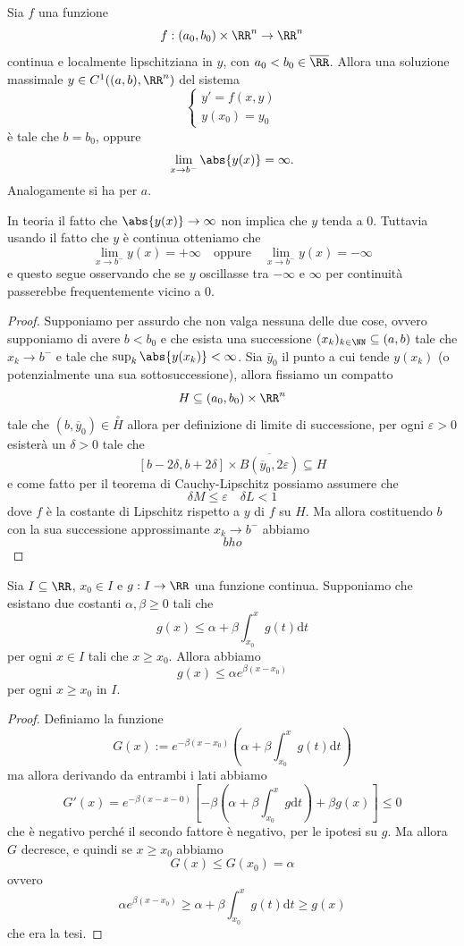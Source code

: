 \documentclass[11pt]{scrartcl}
\newcommand{\dif}{\text{d}}
\begin{document}
 	\begin{theorem}
 		Sia $f$ una funzione 
 		$$f:(a_0,b_0)\times \RR^n\to\RR^n$$
 		continua e localmente lipschitziana in $y$, con $a_0<b_0\in\overline{\RR}$. Allora una soluzione massimale $y\in  C^1((a,b),\RR^n)$ del sistema
 		$$
 		\begin{cases}
 			y'=f(x,y) \\
 			y(x_0)=y_0
 		\end{cases}
 		$$
 		è tale che $b=b_0$, oppure
 		$$\lim_{x\to b^-}\abs{y(x)}=\infty.$$
 		Analogamente si ha per $a$.
 	\end{theorem}
 	\begin{remark}
 		In teoria il fatto che $\abs{y(x)}\to \infty$ non implica che $y$ tenda a $0$. Tuttavia usando il fatto che $y$ è continua otteniamo che
 		$$\lim_{x\to b^-}y(x)=+\infty \quad \text{oppure} \quad \lim_{x\to b^-}y(x)=-\infty$$
 		e questo segue osservando che se $y$ oscillasse tra $-\infty$ e $\infty$ per continuità passerebbe frequentemente vicino a $0$.
 	\end{remark}
 	\begin{proof}
 		Supponiamo per assurdo che non valga nessuna delle due cose, ovvero supponiamo di avere $b<b_0$ e che esista una successione $(x_k)_{k\in\NN}\subseteq (a,b)$ tale che $x_k\to b^-$ e tale che $\sup_k\abs{y(x_k)}<\infty$. Sia $\bar{y}_0$ il punto a cui tende $y(x_k)$ (o potenzialmente una sua sottosuccessione), allora fissiamo un compatto 
 		$$H\subseteq (a_0,b_0)\times\RR^n$$
 		tale che $(b,\overline{y}_0)\in \overset{\circ}{H}$ allora per definizione di limite di successione, per ogni $\varepsilon>0$ esisterà un $\delta>0$ tale che
 		$$[b-2\delta,b+2\delta]\times \overline{B(\overline{y}_0,2\varepsilon)}\subseteq H$$
 		e come fatto per il teorema di Cauchy-Lipschitz possiamo assumere che 
 		$$\delta M \le \varepsilon \quad \delta L <1$$
 		dove $f$ è la costante di Lipschitz rispetto a $y$ di $f$ su $H$. Ma allora costituendo $b$ con la sua successione approssimante $x_k\to b^-$ abbiamo
 		$$bho$$
 	\end{proof}
	\begin{lemma}[di Gronwall]
		Sia $I\subseteq\RR$, $x_0\in I$ e $g:I\to\RR$ una funzione continua. Supponiamo che esistano due costanti $\alpha,\beta\ge 0$ tali che
		$$g(x)\le \alpha+\beta \int_{x_0}^xg(t)\dif t$$
		per ogni $x\in I$ tali che $x\ge x_0$. Allora abbiamo
		$$g(x)\le \alpha e^{\beta (x-x_0)}$$
		per ogni $x\ge x_0$ in $I$.
	\end{lemma}
	\begin{proof}
		Definiamo la funzione
		$$G(x):=e^{-\beta(x-x_0)}\left(\alpha+\beta\int_{x_0}^x g(t)\dif t\right)$$
		ma allora derivando da entrambi i lati abbiamo
		$$G'(x)=e^{-\beta(x-x-0)}\left[-\beta\left(\alpha+\beta\int_{x_0}^x g\dif t\right)+\beta g(x)\right]\le 0$$
		che è negativo perché il secondo fattore è negativo, per le ipotesi su $g$. Ma allora $G$ decresce, e quindi se $x\ge x_0$ abbiamo
		$$G(x)\le G(x_0)=\alpha$$
		ovvero
		$$\alpha e^{\beta(x-x_0)}\ge \alpha + \beta\int_{x_0}^x g(t)\dif t \ge g(x)$$
		che era la tesi.
	\end{proof}
\end{document}
